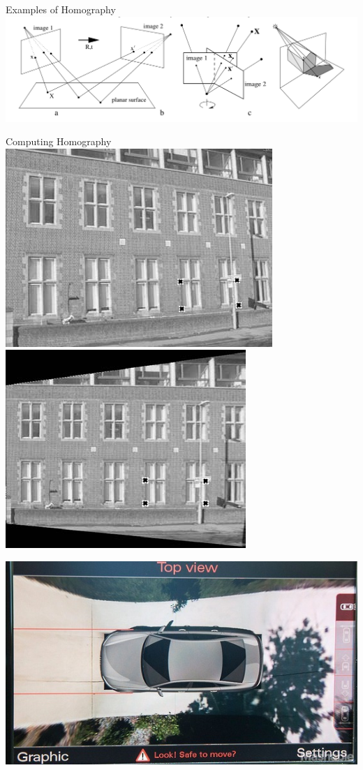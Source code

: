 \documentclass[times,t]{beamer}
\begin{document}
\begin{frame}{Examples  of  Homography}
  \includegraphics[width=\linewidth]{media/examples-of-homography.png}
\end{frame}

\begin{frame}{Computing Homography}
  \includegraphics[width=0.45\linewidth]{media/removing-perspective-distortion.png}
  \includegraphics[width=0.45\linewidth]{media/removing-perspective-distortion-b.png}
\end{frame}
\begin{frame}
  \includegraphics[width=0.60\linewidth]{media/audi top view camera.jpg}
\end{frame}
\end{document}
